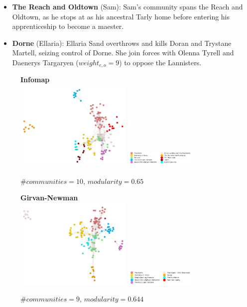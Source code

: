 \documentclass[10pt,twocolumn,letterpaper]{article}
\begin{document}
\begin{itemize}
    \item \textbf{The Reach and Oldtown} (Sam): Sam’s community spans the Reach and Oldtown, as he stops at as his ancestral Tarly home before entering his apprenticeship to become a maester. 
    \item \textbf{Dorne} (Ellaria): Ellaria Sand overthrows and kills Doran and Trystane Martell, seizing control of Dorne. She join forces with Olenna Tyrell and Daenerys Targaryen ($weight_{e,o}=9$) to oppose the Lannisters.    
\end{itemize}

\begin{center}
    \vspace{2cm}
\end{center}

\begin{figure}[!h]
    \centering
    \textbf{Infomap}  \\
    \includegraphics[width=0.5\textwidth]{img/s6/communities_infomap.jpg}
    \includegraphics[width=0.3\textwidth]{img/s6/infomap_legend.jpg}\\
    \caption{\small{$\#communities=10$, $modularity=0.65$}}
    \vspace{2cm}
    \label{fig:infomap_s6}
\end{figure}


\begin{figure}[!h]
    \centering
    \textbf{Girvan-Newman} \\
    \includegraphics[width=0.5\textwidth]{img/s6/communities_g-n.jpg}
    \includegraphics[width=0.3\textwidth]{img/s6/g-n_legend.jpg}\\
    \caption{\small{$\#communities=9$, $modularity=0.644$}}
    \label{fig:gn_s6}
    \vspace{2cm}
\end{figure}
\end{document}
